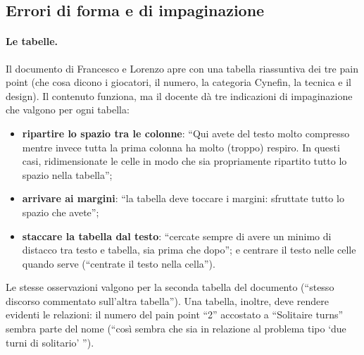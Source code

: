 \subsection{Errori di forma e di impaginazione}
\label{rv:t3:sec:forma}

\paragraph{Le tabelle.} Il documento di Francesco e Lorenzo apre con una
tabella riassuntiva dei tre pain point (che cosa dicono i giocatori, il
numero, la categoria Cynefin, la tecnica e il design). Il contenuto funziona,
ma il docente dà tre indicazioni di impaginazione che valgono per ogni
tabella:
\begin{itemize}
  \item \textbf{ripartire lo spazio tra le colonne}: ``Qui avete del testo
        molto compresso mentre invece tutta la prima colonna ha molto
        (troppo) respiro. In questi casi, ridimensionate le celle in modo che
        sia propriamente ripartito tutto lo spazio nella tabella'';
  \item \textbf{arrivare ai margini}: ``la tabella deve toccare i margini:
        sfruttate tutto lo spazio che avete'';
  \item \textbf{staccare la tabella dal testo}: ``cercate sempre di avere un
        minimo di distacco tra testo e tabella, sia prima che dopo''; e
        centrare il testo nelle celle quando serve (``centrate il testo nella
        cella'').
\end{itemize}
Le stesse osservazioni valgono per la seconda tabella del documento (``stesso
discorso commentato sull'altra tabella''). Una tabella, inoltre, deve rendere
evidenti le relazioni: il numero del pain point ``2'' accostato a
``Solitaire turns'' sembra parte del nome (``così sembra che sia in relazione
al problema tipo `due turni di solitario' '').


